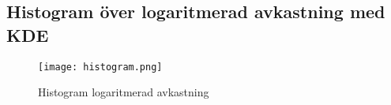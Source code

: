 \documentclass[11pt]{article}
\numberwithin{equation}{section}
\numberwithin{table}{section}
\numberwithin{figure}{section}
\begin{document}
\vspace{0.5cm}
\subsection{Histogram över logaritmerad avkastning med KDE}
\begin{figure}[H]
\caption{Histogram logaritmerad avkastning}
\texttt{[image: histogram.png]}
\centering
\end{figure}


\afterpage{\blankpage}
\newcommand\blankpage{%
    \null
    \thispagestyle{empty}%
    \addtocounter{page}{-1}%
    \newpage}
\end{document}
